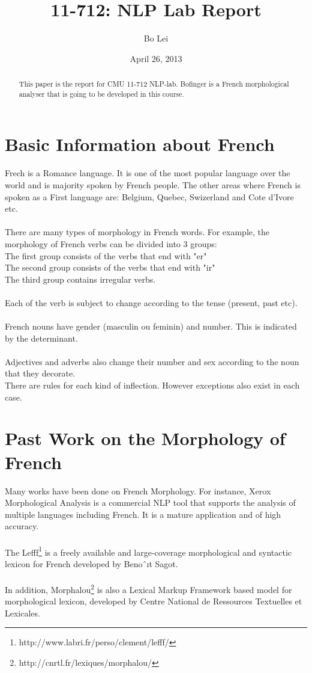 \documentclass[11pt,letterpaper]{article}
\title{11-712:  NLP Lab Report}
\author{Bo Lei}
\date{April 26, 2013}
\begin{document}
\maketitle
\begin{abstract}
This paper is the report for CMU 11-712 NLP-lab. Bofinger is a French morphological analyser that is going to be developed in this course.
\end{abstract}


\section{Basic Information about French}

Frech is a Romance language. It is one of the most popular language over the world and is majority spoken by French people. The other areas where French is spoken as a First language are: Belgium, Quebec, Swizerland and Cote d'Ivore etc.\\
\\
There are many types of morphology in French words. For example, the morphology of French verbs can be divided into 3 groups:\\

\indent\indent The first group consists of the verbs that end with "er"\\
\indent\indent The second group consists of the verbs that end with "ir"\\
\indent\indent The third group contains irregular verbs.\\
\\
Each of the verb is subject to change according to the tense (present, past etc).\\
\\
French nouns have gender (masculin ou feminin) and number. This is indicated by the determinant. \\
\\
Adjectives and adverbs also change their number and sex according to the noun that they decorate.
\\
There are rules for each kind of inflection. However exceptions also exist in each case.


\section{Past Work on the Morphology of French}
Many works have been done on French Morphology. For instance, Xerox Morphological Analysis is a commercial NLP tool that supports the analysis of multiple languages including French. It is a mature application and of high accuracy.\\
\\
The Lefff\footnote{http://www.labri.fr/perso/clement/lefff/} is a freely available and large-coverage morphological and syntactic lexicon for French developed by Benoˆıt Sagot. \\
\\
In addition, Morphalou\footnote{http://cnrtl.fr/lexiques/morphalou/} is also a Lexical Markup Framework based model for morphological lexicon, developed by Centre National de Ressources Textuelles et Lexicales. 
\end{document}
